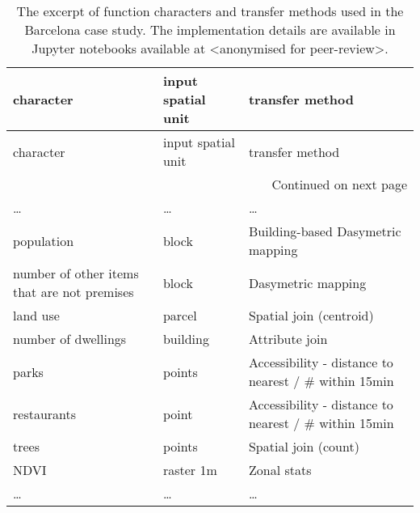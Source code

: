 \begin{longtable}{p{5cm}p{3cm}p{5cm}}
\caption{The excerpt of function characters and transfer methods used in the Barcelona case study. The implementation details are available
in Jupyter notebooks available at <anonymised for peer-review>.}
\label{tab:bcn_fn_excerpt} \\
\toprule
                                        character & input spatial unit &                                    transfer method \\
\midrule
\endfirsthead

\toprule
                                        character & input spatial unit &                                    transfer method \\
\midrule
\endhead
\midrule
\multicolumn{3}{r}{{Continued on next page}} \\
\midrule
\endfoot

\bottomrule
\endlastfoot
\dots &                        \dots &                   \dots  \\

                                        population &              block &                  Building-based Dasymetric mapping \\
    number of other items that are not premises &              block &                                 Dasymetric mapping \\
                                        land use &             parcel &                            Spatial join (centroid) \\
                            number of dwellings &           building &                                     Attribute join \\
                                            parks &             points & Accessibility  - distance to nearest / \# within 15min \\
                                    restaurants &              point & Accessibility  - distance to nearest / \# within 15min \\
                                            trees &             points &                               Spatial join (count) \\
                                            NDVI &          raster 1m &                                        Zonal stats \\
                                            \dots &                        \dots &                   \dots  \\

\end{longtable}
\normalsize

